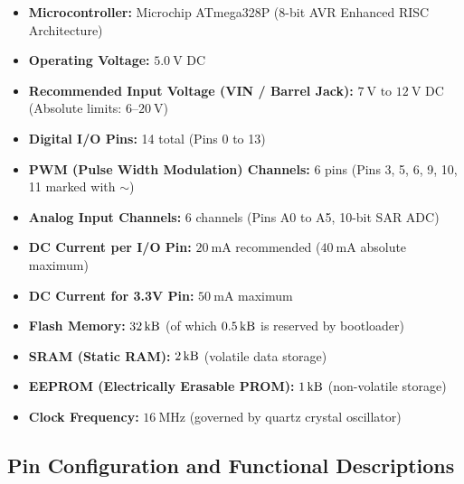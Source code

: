 \begin{pinoutbox}
\begin{itemize}
    \item \textbf{Microcontroller:} Microchip ATmega328P (8-bit AVR Enhanced RISC Architecture)
    \item \textbf{Operating Voltage:} $\SI{5.0}{\volt}$ DC
    \item \textbf{Recommended Input Voltage (VIN / Barrel Jack):} $\SI{7}{\volt} \text{ to } \SI{12}{\volt}$ DC (Absolute limits: $6\text{--}\SI{20}{\volt}$)
    \item \textbf{Digital I/O Pins:} 14 total (Pins 0 to 13)
    \item \textbf{PWM (Pulse Width Modulation) Channels:} 6 pins (Pins 3, 5, 6, 9, 10, 11 marked with $\sim$)
    \item \textbf{Analog Input Channels:} 6 channels (Pins A0 to A5, 10-bit SAR ADC)
    \item \textbf{DC Current per I/O Pin:} $\SI{20}{\milli\ampere}$ recommended ($\SI{40}{\milli\ampere}$ absolute maximum)
    \item \textbf{DC Current for 3.3V Pin:} $\SI{50}{\milli\ampere}$ maximum
    \item \textbf{Flash Memory:} $\SI{32}{\kilo\byte}$ (of which $\SI{0.5}{\kilo\byte}$ is reserved by bootloader)
    \item \textbf{SRAM (Static RAM):} $\SI{2}{\kilo\byte}$ (volatile data storage)
    \item \textbf{EEPROM (Electrically Erasable PROM):} $\SI{1}{\kilo\byte}$ (non-volatile storage)
    \item \textbf{Clock Frequency:} $\SI{16}{\mega\hertz}$ (governed by quartz crystal oscillator)
\end{itemize}
\end{pinoutbox}

\subsection{Pin Configuration and Functional Descriptions}


